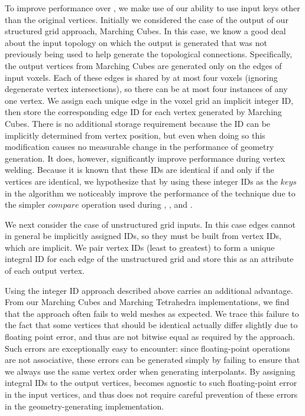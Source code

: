 \documentclass[review,journal]{vgtc}         %
\begin{document}
\label{sec:IntegralIDs}
To improve performance over , we make use of our ability to use input keys other than the original vertices. Initially we considered the case of the output of our structured grid
approach, Marching Cubes. In this case, we know a good deal about the input topology on which the output is generated that was not previously being used to help generate the topological connections. Specifically, the output vertices from Marching Cubes are generated only on the edges of input voxels. Each of these edges is shared by at most four voxels (ignoring degenerate vertex intersections), so there can be at most four instances of any one vertex.
We assign each unique edge in the voxel grid an implicit integer ID, then store the corresponding edge ID for each vertex generated by Marching Cubes. There is no additional storage requirement because the ID can be implicitly determined from vertex position, but even when doing so this modification causes no measurable change in the performance of geometry generation. It does, however, significantly improve performance during vertex welding. Because it is known that these IDs are identical if and only if the vertices are identical, we hypothesize that by using these integer IDs as the $keys$ in the  algorithm we noticeably improve the performance of the technique due to the simpler $compare$ operation used during , , and . 

We next consider the case of unstructured grid inputs. In this case edges cannot in general be implicitly assigned IDs, so they must be built from vertex IDs, which are implicit. We pair vertex IDs (least to greatest) to form a unique integral ID for each edge of the unstructured grid and store this as an attribute of each output vertex. 

Using the integer ID approach described above carries an additional advantage. From our Marching Cubes and Marching Tetrahedra implementations, we find that the  approach often fails to weld meshes as expected. We trace this failure to the fact that some vertices that should be identical actually differ slightly due to floating point error, and thus are not bitwise equal as required by the  approach. Such errors are exceptionally easy to encounter: since floating-point operations are not associative, these errors can be generated simply by failing to ensure that we always use the same vertex order when generating interpolants. By assigning integral IDs to the output vertices,  becomes agnostic to such floating-point error in the input vertices, and thus does not require careful prevention of these errors in the geometry-generating implementation.
\end{document}
